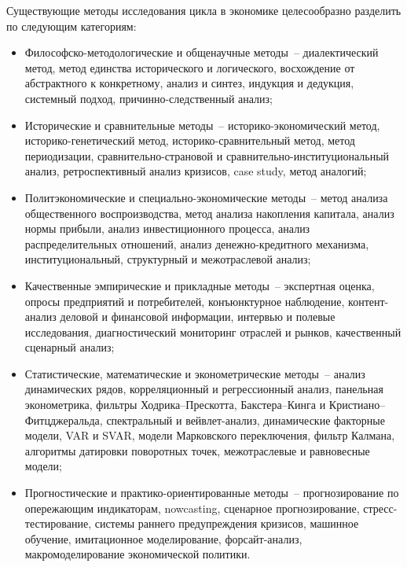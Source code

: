 Существующие методы исследования цикла в экономике целесообразно разделить по следующим категориям:
\begin{itemize}
    \item Философско-методологические и общенаучные методы – диалектический метод, метод единства исторического и логического, восхождение от абстрактного к конкретному, анализ и синтез, индукция и дедукция, системный подход, причинно-следственный анализ;
    \item Исторические и сравнительные методы – историко-экономический метод, историко-генетический метод, историко-сравнительный метод, метод периодизации, сравнительно-страновой и сравнительно-институциональный анализ, ретроспективный анализ кризисов, case study, метод аналогий;
    \item Политэкономические и специально-экономические методы – метод анализа общественного воспроизводства, метод анализа накопления капитала, анализ нормы прибыли, анализ инвестиционного процесса, анализ распределительных отношений, анализ денежно-кредитного механизма, институциональный, структурный и межотраслевой анализ;
    \item Качественные эмпирические и прикладные методы – экспертная оценка, опросы предприятий и потребителей, конъюнктурное наблюдение, контент-анализ деловой и финансовой информации, интервью и полевые исследования, диагностический мониторинг отраслей и рынков, качественный сценарный анализ;
    \item Статистические, математические и эконометрические методы – анализ динамических рядов, корреляционный и регрессионный анализ, панельная эконометрика, фильтры Ходрика–Прескотта, Бакстера–Кинга и Кристиано–Фитцджеральда, спектральный и вейвлет-анализ, динамические факторные модели, VAR и SVAR, модели Марковского переключения, фильтр Калмана, алгоритмы датировки поворотных точек, межотраслевые и равновесные модели;
    \item Прогностические и практико-ориентированные методы – прогнозирование по опережающим индикаторам, nowcasting, сценарное прогнозирование, стресс-тестирование, системы раннего предупреждения кризисов, машинное обучение, имитационное моделирование, форсайт-анализ, макромоделирование экономической политики.
\end{itemize}

